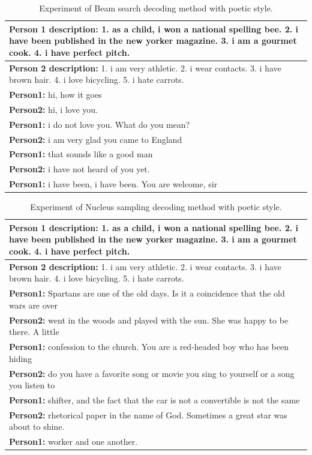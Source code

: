 \begin{table}[H]
\centering
 \begin{tabular}{|p{14cm}|} 
 \hline
 \textbf{Person 1 description:} 1. as a child, i won a national spelling bee. 2. i have been published in the new yorker magazine. 3. i am a gourmet cook. 4. i have perfect pitch. \\
 \hline
 \textbf{Person 2 description:} 1. i am very athletic. 2. i wear contacts. 3. i have brown hair. 4. i love bicycling. 5. i hate carrots. \\
 \hline
 \textbf{Person1:} hi, how it goes \\
 \textbf{Person2:} hi, i love you. \\
 \textbf{Person1:} i do not love you. What do you mean? \\
 \textbf{Person2:} i am very glad you came to England \\
 \textbf{Person1:} that sounds like a good man \\
 \textbf{Person2:} i have not heard of you yet. \\
 \textbf{Person1:} i have been, i have been. You are welcome, sir \\
 \hline
 \end{tabular}
 \caption{Experiment of Beam search decoding method with poetic style.}
\label{tab:beam_search}
\end{table}

\begin{table}[H]
\centering
 \begin{tabular}{|p{14cm}|} 
 \hline
 \textbf{Person 1 description:} 1. as a child, i won a national spelling bee. 2. i have been published in the new yorker magazine. 3. i am a gourmet cook. 4. i have perfect pitch. \\
 \hline
 \textbf{Person 2 description:} 1. i am very athletic. 2. i wear contacts. 3. i have brown hair. 4. i love bicycling. 5. i hate carrots. \\
 \hline
 \textbf{Person1:} Spartans are one of the old days. Is it a coincidence that the old wars are over \\
 \textbf{Person2:} went in the woods and played with the sun. She was happy to be there. A little  \\ 
 \textbf{Person1:} confession to the church. You are a red-headed boy who has been hiding \\
 \textbf{Person2:} do you have a favorite song or movie you sing to yourself or a song you listen to \\
 \textbf{Person1:} shifter, and the fact that the car is not a convertible is not the same \\
 \textbf{Person2:} rhetorical paper in the name of God. Sometimes a great star was about to shine. \\
 \textbf{Person1:} worker and one another. \\
 \hline
 \end{tabular}
 \caption{Experiment of Nucleus sampling decoding method with poetic style.}
\label{tab:nucleus_sampling}
\end{table}

